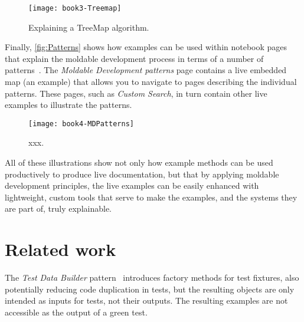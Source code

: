\documentclass[sigplan,anonymous,review,10pt]{acmart}
\begin{document}
\begin{figure}[h]
  \texttt{[image: book3-Treemap]}
  \caption{Explaining a TreeMap algorithm.}
  \label{fig:Treemap}
\end{figure}

Finally, \autoref{fig:Patterns} shows how examples can be used within notebook pages that explain the moldable development process in terms of a number of patterns~\cite{Nier24a}.
The \emph{Moldable Development patterns} page contains a live embedded map (an example) that allows you to navigate to pages describing the individual patterns.
These pages, such as \emph{Custom Search}, in turn contain other live examples to illustrate the patterns.

\begin{figure}[h]
  \texttt{[image: book4-MDPatterns]}
  \caption{xxx.}
  \label{fig:Patterns}
\end{figure}

All of these illustrations show not only how example methods can be used productively to produce live documentation, but that by applying moldable development principles, the live examples can be easily enhanced with lightweight, custom tools that serve to make the examples, and the systems they are part of, truly explainable.


\section{Related work}\label{sec:related}


The \emph{Test Data Builder} pattern~\cite{Free09a} introduces factory methods for test fixtures, also potentially reducing code duplication in tests, but the resulting objects are only intended as inputs for tests, not their outputs.
The resulting examples are not accessible as the output of a green test.
\end{document}
